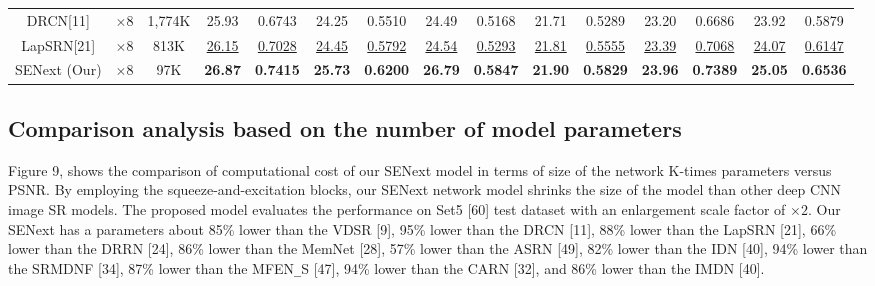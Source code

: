 \documentclass{ieeeaccess}
\begin{document}
\begin{table}
\begin{tabular}{|c|c|c|cc|cc|cc|cc|cc|cc|}
DRCN[11]& $\times8$&1,774K& \multicolumn{1}{c|}{25.93} &  0.6743 & \multicolumn{1}{c|}{24.25} & 0.5510&\multicolumn{1}{c|}{24.49} & 0.5168 & \multicolumn{1}{c|}{21.71  } &0.5289 & \multicolumn{1}{c|}{23.20 } &0.6686
&\multicolumn{1}{c|}{23.92  } &  0.5879       \\


LapSRN[21] & $\times8$&813K& \multicolumn{1}{c|}{\color{blue}\underline{26.15}} &{\color{blue}\underline{0.7028}}   & \multicolumn{1}{c|}{\color{blue}\underline{24.45}} &{\color{blue}\underline{0.5792}}   &\multicolumn{1}{c|}{\color{blue}\underline{24.54}} &{\color{blue}\underline{0.5293}}   & \multicolumn{1}{c|}{\color{blue}\underline{21.81}} &{\color{blue}\underline{0.5555}} & \multicolumn{1}{c|}{\color{blue}\underline{23.39}}  &{\color{blue}\underline{0.7068}} &\multicolumn{1}{c|}{\color{blue}\underline{24.07}} &{\color{blue}\underline{0.6147}} \\



SENext (Our) & $\times8$ &97K& \multicolumn{1}{c|}{\color{red}\textbf{26.87}} &{\color{red}\textbf{0.7415}} & \multicolumn{1}{c|}{\color{red}\textbf{25.73}} &{\color{red}\textbf{0.6200}} & \multicolumn{1}{c|}{\color{red}\textbf{26.79}} &{\color{red}\textbf{0.5847}} & \multicolumn{1}{c|}{\color{red}\textbf{21.90}} &{\color{red}\textbf{0.5829}} & \multicolumn{1}{c|}{\color{red}\textbf{23.96}} &{\color{red}\textbf{0.7389}} &\multicolumn{1}{c|}{\color{red}\textbf{25.05}} &{\color{red}\textbf{0.6536}}  \\

\hline


\end{tabular}
\end{table}



\subsection{Comparison analysis based on the number of model parameters}
Figure 9, shows the comparison of computational cost of our SENext model in terms of size of the network K-times parameters versus PSNR. By employing the squeeze-and-excitation blocks, our SENext network model shrinks the size of the model than other deep CNN image SR models. The proposed model evaluates the performance on Set5 [60] test dataset with an enlargement scale factor of $\times 2$. Our SENext has a parameters about 85\% lower than the VDSR [9], 95\% lower than the DRCN [11], 88\% lower than the LapSRN [21], 66\% lower than the DRRN [24], 86\% lower than the MemNet [28],  57\% lower than the ASRN [49], 82\% lower than the IDN [40], 94\% lower than the SRMDNF [34], 87\% lower than the MFEN\texttt{\_}S [47], 94\% lower than the CARN [32], and 86\% lower than the IMDN [40].
\end{document}
